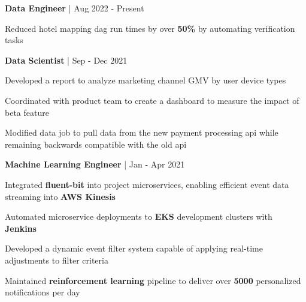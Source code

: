 


\begin{cventries}

\cventry
{\textbf{Data Engineer} | \color{awesome}{Super}}
{Aug 2022 - Present} %
{ %
\begin{cvitems}
\item {Reduced hotel mapping dag run times by over \textbf{50\%} by automating verification tasks}
\end{cvitems}
}

\cventry
{\textbf{Data Scientist} | \color{awesome}{Shopify}}
{Sep - Dec 2021} %
{ %
\begin{cvitems}
\item {Developed a report to analyze marketing channel GMV by user device types}
\item {Coordinated with product team to create a dashboard to measure the impact of beta feature}
\item {Modified data job to pull data from the new payment processing api while remaining backwards compatible with the old api}
\end{cvitems}
}

\cventry
{\textbf{Machine Learning Engineer} | \color{awesome}{Zynga}}
{Jan - Apr 2021} %
{ %
\begin{cvitems}
\item{Integrated \textbf{fluent-bit} into project microservices, enabling efficient event data streaming into \textbf{AWS Kinesis}}
\item {Automated microservice deployments to \textbf{EKS} development clusters with \textbf{Jenkins}}
\item{Developed a dynamic event filter system capable of applying real-time adjustments to filter criteria}
\item {Maintained \textbf{reinforcement learning} pipeline to deliver over \textbf{5000} personalized notifications per day}
\end{cvitems}
}


\end{cventries}
